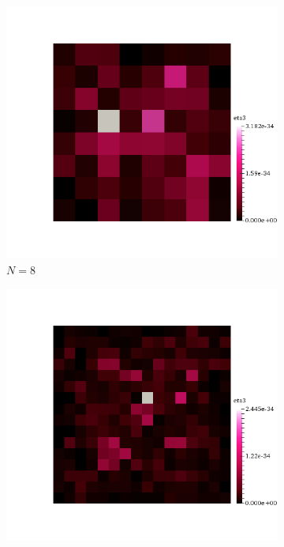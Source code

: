 \mbox{}\\ \\
\begin{figure}[h!]
  \centering
  \begin{subfigure}[b]{0.24\textwidth}
    \includegraphics[width=\textwidth,height=\textheight,keepaspectratio,height=\textheight,keepaspectratio]{figures/1_mpet/space/eta3_8.png}
    \caption{$N=8$}
  \end{subfigure}
  \begin{subfigure}[b]{0.24\textwidth}
    \includegraphics[width=\textwidth,height=\textheight,keepaspectratio,height=\textheight,keepaspectratio]{figures/1_mpet/space/eta3_16.png}

\end{subfigure}
\end{figure}
